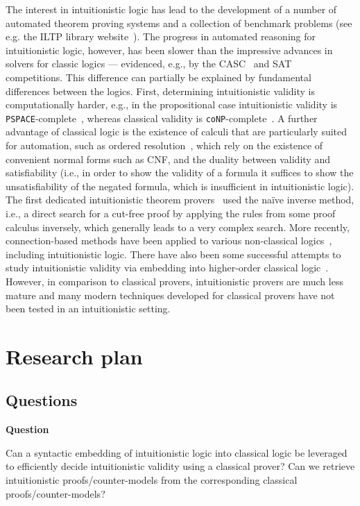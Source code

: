\documentclass{article}
\theoremstyle{definition}
\theoremstyle{definition}
\theoremstyle{definition}
\theoremstyle{definition}
\theoremstyle{definition}
\theoremstyle{definition}
\theoremstyle{definition}
\newcommand{\0}{\mathbf 0}
\newcommand{\1}{\mathbf 1}
\newcounter{question}
\newenvironment{question}{\smallskip\noindent\textbf{Question \refstepcounter{question}\arabic{question}}\begin{em}}{\end{em}}
\begin{document}
	The interest in intuitionistic logic has lead to the development of a number of automated theorem proving systems and a collection of benchmark problems (see e.g. the ILTP library website~\cite{iltp}).
	The progress in automated reasoning for intuitionistic logic, however, has been slower than the  impressive advances in solvers for classic logics --- evidenced, e.g., by the CASC~\cite{casc} and SAT~\cite{satc} competitions.
	This difference can partially be explained by fundamental differences between the logics.
	First, determining intuitionistic validity is computationally harder, e.g., in the propositional case intuitionistic validity is \verb+PSPACE+-complete~\cite{statman1979intuitionistic}, whereas classical validity is \verb+coNP+-complete~\cite{cook1971complexity}.
	A further advantage of classical logic is the existence of calculi that are particularly suited for automation, such as ordered resolution~\cite{bachmair2001resolution}, which rely on the existence of convenient normal forms such as CNF, and the duality between validity and satisfiability (i.e., in order to show the validity of a formula it suffices to show the unsatisfiability of the negated formula, which is insufficient in intuitionistic logic).
	The first dedicated intuitionistic theorem provers~\cite{mclaughlin2009efficient,tammet1996resolution} used the naïve inverse method, i.e., a direct search for a cut-free proof by applying the rules from some proof calculus inversely, which generally leads to a very complex search.
	More recently, connection-based methods have been applied to various non-classical logics~\cite{otten2005clausal,otten2021nanocop}, including intuitionistic logic.
	There have also been some successful attempts to study intuitionistic validity via embedding into higher-order classical logic~\cite{LEO}.
	However, in comparison to classical provers, intuitionistic provers are much less mature and many modern techniques developed for classical provers have not been tested in an intuitionistic setting.

	\section{Research plan}

	\subsection{Questions}

	\begin{question}
		Can a syntactic embedding of intuitionistic logic into classical logic be leveraged to efficiently decide intuitionistic validity using a classical prover? Can we retrieve intuitionistic proofs/counter-models from the corresponding classical proofs/counter-models?
	\end{question}
\end{document}
